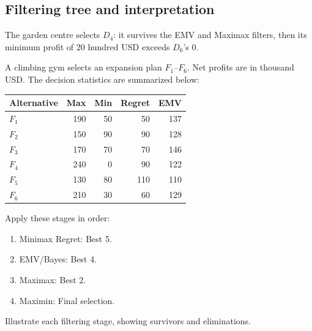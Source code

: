 \subsection*{Filtering tree and interpretation}
\begin{center}
\end{center}
The garden centre selects $D_4$: it survives the EMV and Maximax filters, then its minimum profit of 20 hundred USD exceeds $D_6$'s 0.
\secInicio[sec:q3]

A climbing gym selects an expansion plan $F_1$--$F_6$. Net profits are in thousand USD. The decision statistics are summarized below:
\vspace{-3mm}
\begin{center}\small\setlength{\tabcolsep}{4pt}
	\begin{tabular}{lrrrr}\toprule
		Alternative & Max & Min & Regret & EMV\\ \midrule
		$F_1$ & 190 & 50 & 50 & 137\\
		$F_2$ & 150 & 90 & 90 & 128\\
		$F_3$ & 170 & 70 & 70 & 146\\
		$F_4$ & 240 & 0 & 90 & 122\\
		$F_5$ & 130 & 80 & 110 & 110\\
		$F_6$ & 210 & 30 & 60 & 129\\
		\bottomrule
	\end{tabular}
\end{center}
\vspace{-3mm}
Apply these stages in order:
\begin{enumerate}[leftmargin=*]
	\item Minimax Regret: Best 5.
	\item EMV/Bayes: Best 4.
	\item Maximax: Best 2.
	\item Maximin: Final selection.
\end{enumerate}
Illustrate each filtering stage, showing survivors and eliminations.
\label{sol:q4table}

